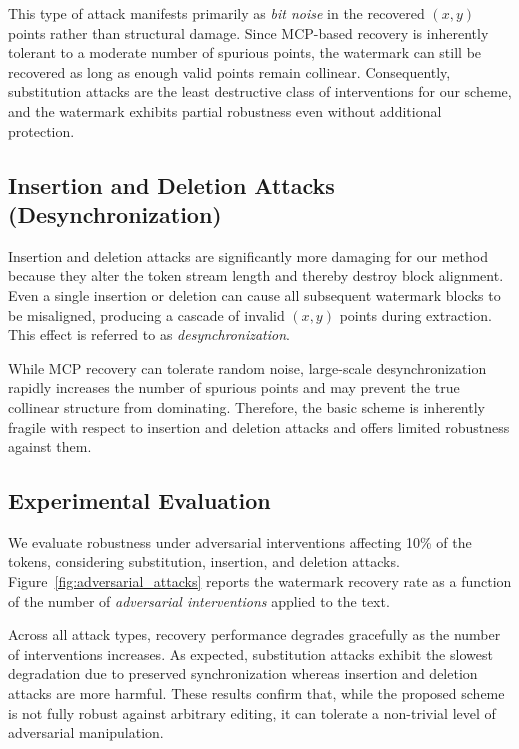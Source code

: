 \documentclass[a4paper,11pt]{llncs}
\begin{document}
This type of attack manifests primarily as \emph{bit noise} in the recovered $(x,y)$ points rather than structural damage. Since MCP-based recovery is inherently tolerant to a moderate number of spurious points, the watermark can still be recovered as long as enough valid points remain collinear. Consequently, substitution attacks are the least destructive class of interventions for our scheme, and the watermark exhibits partial robustness even without additional protection.




\subsection{Insertion and Deletion Attacks (Desynchronization)}

Insertion and deletion attacks are significantly more damaging for our method because they alter the token stream length and thereby destroy block alignment. Even a single insertion or deletion can cause all subsequent watermark blocks to be misaligned, producing a cascade of invalid $(x,y)$ points during extraction. This effect is referred to as \emph{desynchronization}.

While MCP recovery can tolerate random noise, large-scale desynchronization rapidly increases the number of spurious points and may prevent the true collinear structure from dominating. Therefore, the basic scheme is inherently fragile with respect to insertion and deletion attacks and offers limited robustness against them.


\subsection{Experimental Evaluation}

We evaluate robustness under adversarial interventions affecting 10\% of the tokens, considering substitution, insertion, and deletion attacks. Figure~\ref{fig:adversarial_attacks} reports the watermark recovery rate as a function of the number of  \emph{adversarial interventions} applied to the text.

Across all attack types, recovery performance degrades gracefully as the number of interventions increases. As expected, substitution attacks exhibit the slowest degradation due to preserved synchronization whereas insertion and deletion attacks are more harmful. These results confirm that, while the proposed scheme is not fully robust against arbitrary editing, it can tolerate a non-trivial level of adversarial manipulation.
\end{document}
